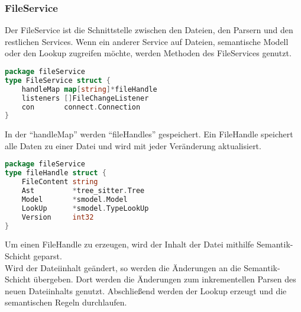 \documentclass[./einleitung.tex]{subfiles}
\begin{document}
    \subsubsection[FileService]{FileService }
    \label{subsubsec:file-service}
    Der FileService ist die Schnittstelle zwischen den Dateien, den Parsern und den restlichen Services.
    Wenn ein anderer Service auf Dateien, semantische Modell oder den Lookup zugreifen möchte, werden Methoden des FileServices genutzt.
    \begin{lstlisting}[language=Go]
package fileService
type FileService struct {
	handleMap map[string]*fileHandle
	listeners []FileChangeListener
	con       connect.Connection
}
    \end{lstlisting}
    In der ``handleMap'' werden ``fileHandles'' gespeichert.
    Ein FileHandle speichert alle Daten zu einer Datei und wird mit jeder Veränderung aktualisiert.
    \begin{lstlisting}[language=Go]
package fileService
type fileHandle struct {
	FileContent string
	Ast         *tree_sitter.Tree
	Model       *smodel.Model
	LookUp      *smodel.TypeLookUp
	Version     int32
}
    \end{lstlisting}
    Um einen FileHandle zu erzeugen, wird der Inhalt der Datei mithilfe Semantik-Schicht geparst.\\
    Wird der Dateiinhalt geändert, so werden die Änderungen an die Semantik-Schicht übergeben.
    Dort werden die Änderungen zum inkrementellen Parsen des neuen Dateiinhalts genutzt.
    Abschließend werden der Lookup erzeugt und die semantischen Regeln durchlaufen. \\
\end{document}
